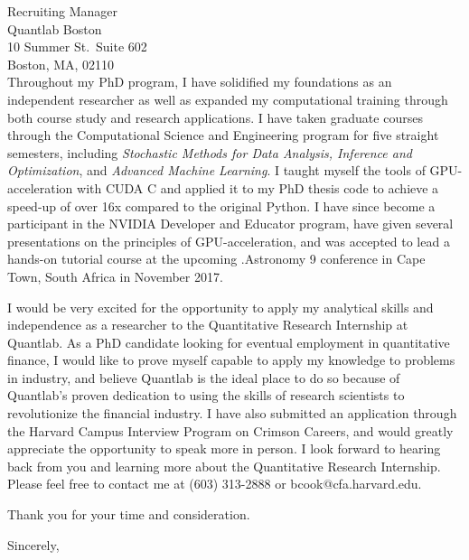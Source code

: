 \documentclass{letter}
\begin{document}
\begin{letter}{Recruiting Manager\\
Quantlab Boston\\
10 Summer St.~Suite 602\\
Boston, MA, 02110\\
}
\noindent Throughout my PhD program, I have solidified my foundations
as an independent researcher as well as expanded my computational
training through both course study and research applications. I have
taken graduate courses through the Computational Science and
Engineering program for five straight semesters, including
\textit{Stochastic Methods for Data Analysis, Inference and
  Optimization}, and \textit{Advanced Machine Learning}. I taught
myself the tools of GPU-acceleration with CUDA C and applied it to my
PhD thesis code to achieve a speed-up of over 16x compared to the
original Python. I have since become a participant in the NVIDIA
Developer and Educator program, have given several presentations on
the principles of GPU-acceleration, and was accepted to lead a
hands-on tutorial course at the upcoming .Astronomy 9 conference in
Cape Town, South Africa in November 2017.

\noindent I would be very excited for the opportunity to apply my
analytical skills and independence as a researcher to the Quantitative
Research Internship at Quantlab. As a PhD candidate looking for
eventual employment in quantitative finance, I would like to prove
myself capable to apply my knowledge to problems in industry, and
believe Quantlab is the ideal place to do so because of Quantlab's
proven dedication to using the skills of research scientists to
revolutionize the financial industry. I have also submitted an
application through the Harvard Campus Interview Program on Crimson
Careers, and would greatly appreciate the opportunity to speak more in
person. I look forward to hearing back from you and learning more
about the Quantitative Research Internship. Please feel free to
contact me at (603) 313-2888 or bcook@cfa.harvard.edu.

Thank you for your time and consideration.


\closing{Sincerely,}


\end{letter}
\end{document}
